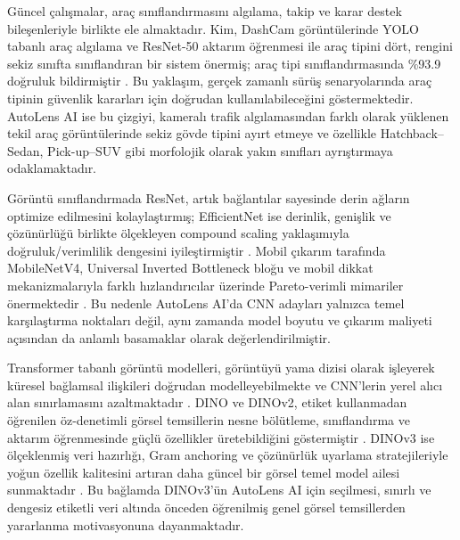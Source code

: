 \documentclass[conference]{IEEEtran}
\begin{document}
Güncel çalışmalar, araç sınıflandırmasını algılama, takip ve karar destek bileşenleriyle birlikte ele almaktadır. Kim, DashCam görüntülerinde YOLO tabanlı araç algılama ve ResNet-50 aktarım öğrenmesi ile araç tipini dört, rengini sekiz sınıfta sınıflandıran bir sistem önermiş; araç tipi sınıflandırmasında \%93.9 doğruluk bildirmiştir \cite{kim2024vehicle}. Bu yaklaşım, gerçek zamanlı sürüş senaryolarında araç tipinin güvenlik kararları için doğrudan kullanılabileceğini göstermektedir. AutoLens AI ise bu çizgiyi, kameralı trafik algılamasından farklı olarak yüklenen tekil araç görüntülerinde sekiz gövde tipini ayırt etmeye ve özellikle Hatchback--Sedan, Pick-up--SUV gibi morfolojik olarak yakın sınıfları ayrıştırmaya odaklamaktadır.

Görüntü sınıflandırmada ResNet, artık bağlantılar sayesinde derin ağların optimize edilmesini kolaylaştırmış; EfficientNet ise derinlik, genişlik ve çözünürlüğü birlikte ölçekleyen compound scaling yaklaşımıyla doğruluk/verimlilik dengesini iyileştirmiştir \cite{he2016deep,tan2019efficientnet}. Mobil çıkarım tarafında MobileNetV4, Universal Inverted Bottleneck bloğu ve mobil dikkat mekanizmalarıyla farklı hızlandırıcılar üzerinde Pareto-verimli mimariler önermektedir \cite{qin2024mobilenetv4}. Bu nedenle AutoLens AI'da CNN adayları yalnızca temel karşılaştırma noktaları değil, aynı zamanda model boyutu ve çıkarım maliyeti açısından da anlamlı basamaklar olarak değerlendirilmiştir.

Transformer tabanlı görüntü modelleri, görüntüyü yama dizisi olarak işleyerek küresel bağlamsal ilişkileri doğrudan modelleyebilmekte ve CNN'lerin yerel alıcı alan sınırlamasını azaltmaktadır \cite{dosovitskiy2020image}. DINO ve DINOv2, etiket kullanmadan öğrenilen öz-denetimli görsel temsillerin nesne bölütleme, sınıflandırma ve aktarım öğrenmesinde güçlü özellikler üretebildiğini göstermiştir \cite{caron2021emerging,oquab2023dinov2}. DINOv3 ise ölçeklenmiş veri hazırlığı, Gram anchoring ve çözünürlük uyarlama stratejileriyle yoğun özellik kalitesini artıran daha güncel bir görsel temel model ailesi sunmaktadır \cite{simeoni2025dinov3}. Bu bağlamda DINOv3'ün AutoLens AI için seçilmesi, sınırlı ve dengesiz etiketli veri altında önceden öğrenilmiş genel görsel temsillerden yararlanma motivasyonuna dayanmaktadır.
\end{document}
